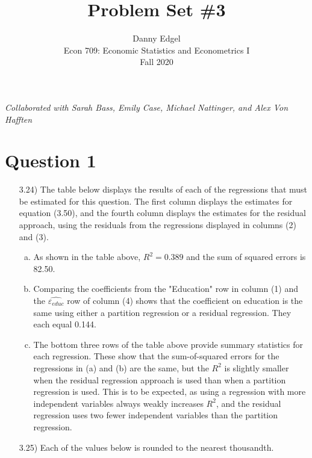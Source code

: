 \documentclass{article}
\begin{document}
\title{	Problem Set \#3 }
\author{ 	Danny Edgel 										\\ 
			Econ 709: Economic Statistics and Econometrics I	\\
			Fall 2020											\\
		}
\maketitle\thispagestyle{empty}


\noindent\textit{Collaborated with Sarah Bass, Emily Case, Michael Nattinger, and Alex Von Hafften}


\section*{Question 1}
\begin{itemize}
	\item[3.24)] The table below displays the results of each of the regressions that must be estimated for this question. The first column displays the estimates for equation (3.50), and the fourth column displays the estimates for the residual approach, using the residuals from the regressions displayed in columns (2) and (3).
		\begin{center}
			
		\end{center}
		\begin{enumerate}[(a)]
			\item As shown in the table above, ${R^2=0.389}$ and the sum of squared errors is 82.50.
			
			\item Comparing the coefficients from the "Education" row in column (1) and the $\hat{\varepsilon_{educ}}$ row of column (4) shows that the coefficient on education is the same using either a partition regression or a residual regression. They each equal 0.144.
			
			\item The bottom three rows of the table above provide summary statistics for each regression. These show that the sum-of-squared errors for the regressions in (a) and (b) are the same, but the $R^2$ is slightly smaller when the residual regression approach is used than when a partition regression is used. This is to be expected, as using a regression with more independent variables always weakly increases $R^2$, and the residual regression uses two fewer independent variables than the partition regression.
			
		\end{enumerate}
	
	\item[3.25)] Each of the values below is rounded to the nearest thousandth.
		
	
\end{itemize}
\end{document}
